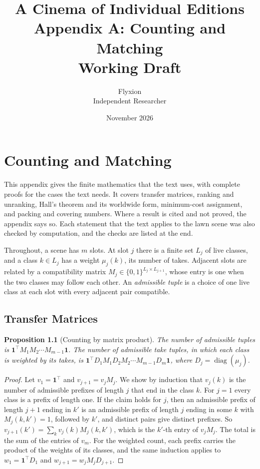 \documentclass[11pt,twoside,openright]{book}
\title{\Huge\bfseries A Cinema of Individual Editions\\[1.2ex]
\large Appendix A: Counting and Matching\\[0.4ex]
\large Working Draft}
\author{Flyxion\\[0.3ex]\small Independent Researcher}
\date{November 2026}
\theoremstyle{plain}
\newtheorem{proposition}[theorem]{Proposition}
\theoremstyle{definition}
\theoremstyle{remark}
\begin{document}
\frontmatter
\maketitle
\tableofcontents
\mainmatter
\appendix
\setcounter{chapter}{0}

\chapter{Counting and Matching}
\label{app:counting}

This appendix gives the finite mathematics that the text uses, with complete proofs for the cases the text needs. It covers transfer matrices, ranking and unranking, Hall's theorem and its worldwide form, minimum-cost assignment, and packing and covering numbers. Where a result is cited and not proved, the appendix says so. Each statement that the text applies to the lawn scene was also checked by computation, and the checks are listed at the end.

Throughout, a scene has $m$ slots. At slot $j$ there is a finite set $L_j$ of live classes, and a class $k\in L_j$ has a weight $\mu_j(k)$, its number of takes. Adjacent slots are related by a compatibility matrix $M_j\in\{0,1\}^{L_j\times L_{j+1}}$, whose entry is one when the two classes may follow each other. An \emph{admissible tuple} is a choice of one live class at each slot with every adjacent pair compatible.

\section{Transfer Matrices}\label{sec:transfer}

\begin{proposition}[Counting by matrix product]\label{prop:transfer}
The number of admissible tuples is $\mathbf 1^{\top}M_1M_2\cdots M_{m-1}\mathbf 1$. The number of admissible take tuples, in which each class is weighted by its takes, is $\mathbf 1^{\top}D_1M_1D_2M_2\cdots M_{m-1}D_m\mathbf 1$, where $D_j=\operatorname{diag}(\mu_j)$.
\end{proposition}

\begin{proof}
Let $v_1=\mathbf 1^{\top}$ and $v_{j+1}=v_jM_j$. We show by induction that $v_j(k)$ is the number of admissible prefixes of length $j$ that end in the class $k$. For $j=1$ every class is a prefix of length one. If the claim holds for $j$, then an admissible prefix of length $j+1$ ending in $k'$ is an admissible prefix of length $j$ ending in some $k$ with $M_j(k,k')=1$, followed by $k'$, and distinct pairs give distinct prefixes. So $v_{j+1}(k')=\sum_kv_j(k)M_j(k,k')$, which is the $k'$-th entry of $v_jM_j$. The total is the sum of the entries of $v_m$. For the weighted count, each prefix carries the product of the weights of its classes, and the same induction applies to $w_1=\mathbf 1^{\top}D_1$ and $w_{j+1}=w_jM_jD_{j+1}$.
\end{proof}
\end{document}
